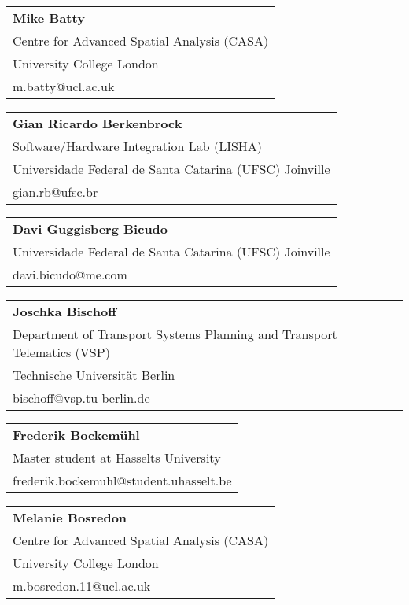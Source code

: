 \begin{tabular}[width=0.48\textwidth]{@{}l}
\textbf{Mike Batty} \\
Centre for Advanced Spatial Analysis (CASA) \\
University College London \\
m.batty@ucl.ac.uk \\
\end{tabular}

\begin{tabular}[width=0.48\textwidth]{@{}l}
\textbf{Gian Ricardo Berkenbrock} \\
Software/Hardware Integration Lab (LISHA)\\
Universidade Federal de Santa Catarina (UFSC) Joinville \\
gian.rb@ufsc.br \\
\end{tabular}

\begin{tabular}[width=0.48\textwidth]{@{}l}
\textbf{Davi Guggisberg Bicudo} \\
Universidade Federal de Santa Catarina (UFSC) Joinville \\
davi.bicudo@me.com \\
\end{tabular}

\begin{tabular}[width=0.48\textwidth]{@{}l}
\textbf{Joschka Bischoff} \\
Department of Transport Systems Planning and Transport Telematics (VSP) \\
Technische Universität Berlin \\
bischoff@vsp.tu-berlin.de \\
\end{tabular}

\begin{tabular}[width=0.48\textwidth]{@{}l}
\textbf{Frederik Bockemühl} \\
Master student at Hasselts University \\
frederik.bockemuhl@student.uhasselt.be \\
\end{tabular}

\begin{tabular}[width=0.48\textwidth]{@{}l}
\textbf{Melanie Bosredon} \\
Centre for Advanced Spatial Analysis (CASA) \\
University College London \\
m.bosredon.11@ucl.ac.uk \\
\end{tabular}


